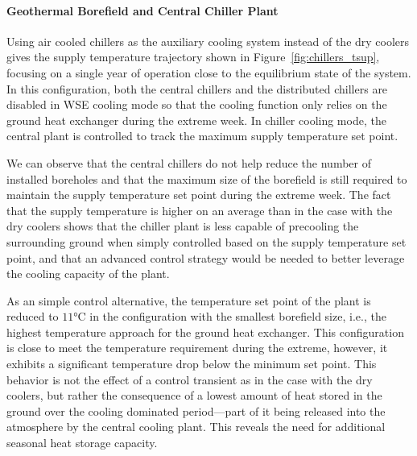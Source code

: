 \paragraph{Geothermal Borefield and Central Chiller Plant}

Using air cooled chillers as the auxiliary cooling system instead of the dry coolers gives the supply temperature trajectory shown in Figure~\ref{fig:chillers_tsup}, focusing on a single year of operation close to the equilibrium state of the system.
In this configuration, both the central chillers and the distributed chillers are disabled in WSE cooling mode so that the cooling function only relies on the ground heat exchanger during the extreme week.
In chiller cooling mode, the central plant is controlled to track the maximum supply temperature set point.

We can observe that the central chillers do not help reduce the number of installed boreholes and  that the maximum size of the borefield is still required to maintain the supply temperature set point during the extreme week. The fact that the supply temperature is higher on an average than in the case with the dry coolers shows that the chiller plant is less capable of precooling the surrounding ground when simply controlled based on the supply temperature set point, and that an advanced control strategy would be needed to better leverage the cooling capacity of the plant.

As an simple control alternative, the temperature set point of the plant is reduced to $11$°C in the configuration with the smallest borefield size, i.e., the highest temperature approach for the ground heat exchanger. This configuration is close to meet the temperature requirement during the extreme, however, it exhibits a significant temperature drop below the minimum set point.
This behavior is not the effect of a control transient as in the case with the dry coolers, but rather the consequence of a lowest amount of heat stored in the ground over the cooling dominated period---part of it being released into the atmosphere by the central cooling plant. This reveals the need for additional seasonal heat storage capacity.



